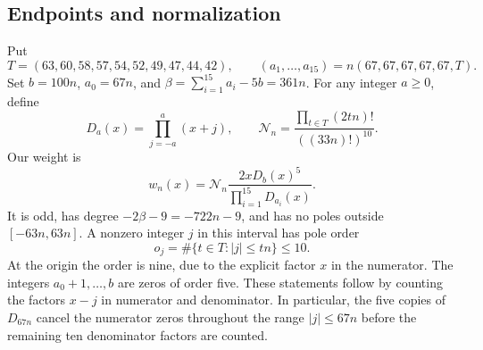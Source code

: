 \documentclass[11pt]{article}
\theoremstyle{definition}\newtheorem{definition}[theorem]{Definition}
\theoremstyle{remark}\newtheorem{remark}[theorem]{Remark}
\begin{document}
\subsection{Endpoints and normalization}
Put
\begin{equation}\label{eq:endpoints}
 T=(63,60,58,57,54,52,49,47,44,42),\qquad
 (a_1,\ldots,a_{15})=n(67,67,67,67,67,T).
\end{equation}
Set $b=100n$, $a_0=67n$, and $\beta=\sum_{i=1}^{15}a_i-5b=361n$.
For any integer $a\ge0$, define
\[
 D_a(x)=\prod_{j=-a}^{a}(x+j),\qquad
 \mathcal N_n=\frac{\prod_{t\in T}(2tn)!}{((33n)!)^{10}}.
\]
Our weight is
\begin{equation}\label{eq:weight}
 w_n(x)=\mathcal N_n\frac{2xD_b(x)^5}{\prod_{i=1}^{15}D_{a_i}(x)}.
\end{equation}
It is odd, has degree $-2\beta-9=-722n-9$, and has no poles outside
$[-63n,63n]$.  A nonzero integer $j$ in this interval has pole order
\[
 o_j=\#\{t\in T:|j|\le tn\}\le10.
\]
At the origin the order is nine, due to the explicit factor $x$ in the
numerator.  The integers $a_0+1,\ldots,b$ are zeros of order five.
These statements follow by counting the factors $x-j$ in numerator and
denominator.  In particular, the five copies of $D_{67n}$ cancel the
numerator zeros throughout the range $|j|\le67n$ before the remaining
ten denominator factors are counted.
\end{document}
